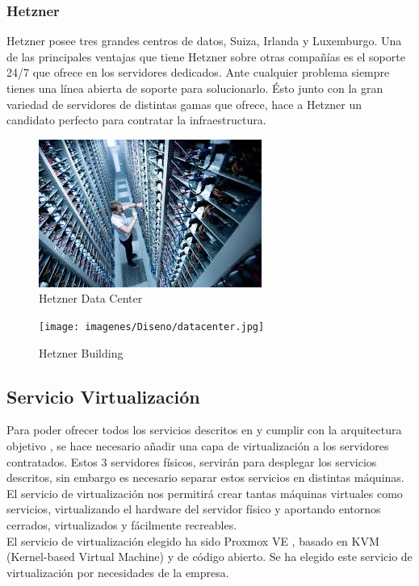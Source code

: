 		\subsubsection{Hetzner}
		\begin{paragraph}
			Hetzner posee tres grandes centros de datos, Suiza, Irlanda y Luxemburgo. Una de las principales ventajas que tiene Hetzner sobre otras compañías es el soporte 24/7 que ofrece en los servidores dedicados. Ante cualquier problema siempre tienes una línea abierta de soporte para solucionarlo. Ésto junto con la gran variedad de servidores de distintas gamas que ofrece, hace a Hetzner un candidato perfecto para contratar la infraestructura.
			
			\begin{figure}[!hbt]
				\centering
				\includegraphics[scale=0.75]{imagenes/Diseno/baremetal.jpeg}
				\caption[Hetzner Data Center]{Hetzner Data Center \cite{hetzner:online}} 
				\label{Hetzner Data Center}
			\end{figure} 
		
			\begin{figure}[!hbt]
				\centering
				\texttt{[image: imagenes/Diseno/datacenter.jpg]}
				\caption[Hetzner Building]{Hetzner Building \cite{hetzner:online}} 
				\label{Hetzner Building}
				\end{figure} 
			\end{paragraph}
		
	\subsection{Servicio Virtualización}
		\begin{paragraph}
			Para poder ofrecer todos los servicios descritos en  y cumplir con la arquitectura objetivo , se hace necesario añadir una capa de virtualización a los servidores contratados. Estos 3 servidores físicos, servirán para desplegar los servicios descritos, sin embargo es necesario separar estos servicios en distintas máquinas. El servicio de virtualización nos permitirá crear tantas máquinas virtuales como servicios, virtualizando el hardware del servidor físico y aportando entornos cerrados, virtualizados y fácilmente recreables. \\
			El servicio de virtualización elegido ha sido Proxmox VE \cite{proxmox:online}, basado en KVM (Kernel-based Virtual Machine) y de código abierto. Se ha elegido este servicio de virtualización por necesidades de la empresa.
		\end{paragraph}
